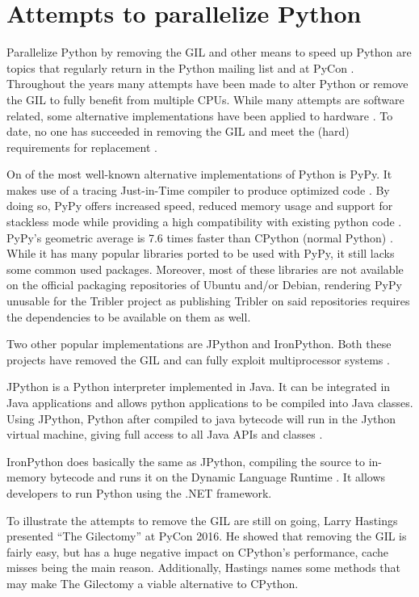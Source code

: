 \section{Attempts to parallelize Python}
\label{sct:removing_the_gil}

Parallelize Python by removing the GIL and other means to speed up Python are topics that regularly return in the Python mailing list and at PyCon \cite{python2015global}.
Throughout the years many attempts have been made to alter Python or remove the GIL to fully benefit from multiple CPUs.
While many attempts are software related, some alternative implementations have been applied to hardware \cite{tabba2010adding}.
To date, no one has succeeded in removing the GIL and meet the (hard) requirements for replacement \cite{python2015global}.

On of the most well-known alternative implementations of Python is PyPy.
It makes use of a tracing Just-in-Time compiler to produce optimized code \cite{bolz2009tracing}.
By doing so, PyPy offers increased speed, reduced memory usage and support for stackless mode while providing a high compatibility with existing python code \cite{pypy2016pypy}.
PyPy's geometric average is 7.6 times faster than CPython (normal Python) \cite{pypy2016speed}.
While it has many popular libraries ported to be used with PyPy, it still lacks some common used packages.
Moreover, most of these libraries are not available on the official packaging repositories of Ubuntu and/or Debian, rendering PyPy unusable for the Tribler project as publishing Tribler on said repositories requires the dependencies to be available on them as well.

Two other popular implementations are JPython and IronPython.
Both these projects have removed the GIL and can fully exploit multiprocessor systems \cite{python2015global}.

JPython is a Python interpreter implemented in Java. It can be integrated in Java applications and allows python applications to be compiled into Java classes.
Using JPython, Python after compiled to java bytecode will run in the Jython virtual machine, giving full access to all Java APIs and classes \cite{jython2016why}.

IronPython does basically the same as JPython, compiling the source to in-memory bytecode and runs it on the Dynamic Language Runtime \cite{ironpython2014}.
It allows developers to run Python using the .NET framework.

To illustrate the attempts to remove the GIL are still on going, Larry Hastings presented \enquote{The Gilectomy} at PyCon 2016.
He showed that removing the GIL is fairly easy, but has a huge negative impact on CPython's performance, cache misses being the main reason.
Additionally, Hastings names some methods that may make The Gilectomy a viable alternative to CPython.\\

